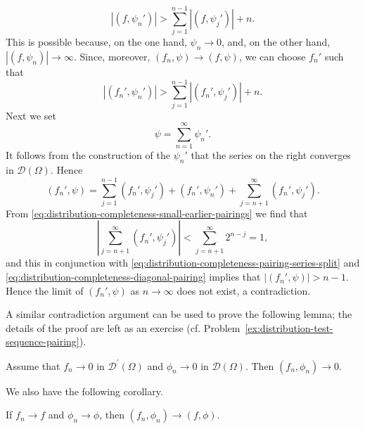 \begin{Proof}
\begin{equation}\label{eq:distribution-completeness-large-limit-pairing}
|(f,\psi_n')|>\sum_{j=1}^{n-1}|(f,\psi_j')|+n.
\end{equation}
This is possible because, on the one hand, $\psi_n\to0$, and, on the other hand, $|(f,\psi_n)|\to\infty$. Since, moreover, $(f_n,\psi)\to(f,\psi)$, we can choose $f_n'$ such that
\begin{equation}\label{eq:distribution-completeness-diagonal-pairing}
|(f_n',\psi_n')|>\sum_{j=1}^{n-1}|(f_n',\psi_j')|+n.
\end{equation}
Next we set
\begin{equation}\label{eq:distribution-completeness-test-series}
\psi=\sum_{n=1}^{\infty}\psi_n'.
\end{equation}
It follows from the construction of the $\psi_n'$ that the series on the right converges in $\mathcal{D}(\Omega)$. Hence
\begin{equation}\label{eq:distribution-completeness-pairing-series-split}
(f_n',\psi)=\sum_{j=1}^{n-1}(f_n',\psi_j')+(f_n',\psi_n')+\sum_{j=n+1}^{\infty}(f_n',\psi_j').
\end{equation}
From \eqref{eq:distribution-completeness-small-earlier-pairings} we find that
\begin{equation}\label{eq:distribution-completeness-tail-estimate}
\left|\sum_{j=n+1}^{\infty}(f_n',\psi_j')\right|<\sum_{j=n+1}^{\infty}2^{n-j}=1,
\end{equation}
and this in conjunction with \eqref{eq:distribution-completeness-pairing-series-split} and \eqref{eq:distribution-completeness-diagonal-pairing} implies that $|(f_n',\psi)|>n-1$. Hence the limit of $(f_n',\psi)$ as $n\to\infty$ does not exist, a contradiction.
\end{Proof}

A similar contradiction argument can be used to prove the following lemma; the details of the proof are left as an exercise (cf. Problem~\ref{ex:distribution-test-sequence-pairing}).

\begin{Lemma}
\label{lem:distribution-test-sequence-pairing}
Assume that $f_n\to0$ in $\mathcal{D}^{\prime}(\Omega)$ and $\phi_n\to0$ in $\mathcal{D}(\Omega)$. Then $(f_n,\phi_n)\to0$.
\end{Lemma}

We also have the following corollary.

\begin{Corollary}
\label{cor:distribution-joint-continuity}
If $f_n\to f$ and $\phi_n\to\phi$, then $(f_n,\phi_n)\to(f,\phi)$.
\end{Corollary}

